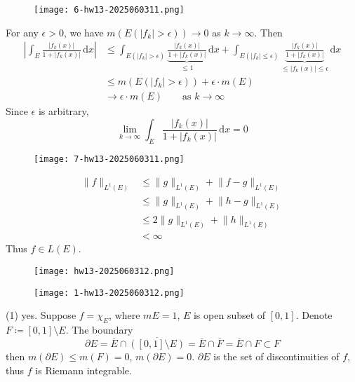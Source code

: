 \begin{exercise}
\begin{figure}[H]
\centering
\texttt{[image: 6-hw13-2025060311.png]}
\label{}
\end{figure}
\end{exercise}
For any $\epsilon>0$, we have $m(E(\lvert f_k \rvert>\epsilon))\to0$ as $k\to \infty$. Then
\[
\begin{aligned}
\left\lvert  \int_{E}^{} \frac{\lvert f_k(x) \rvert }{1+\lvert f_k(x) \rvert } \, \mathrm{d}x   \right\rvert  & \leq \int_{E(\lvert f_k \rvert >\epsilon)}^{} \underbrace{ \frac{\lvert f_k(x) \rvert }{1+\lvert f_k(x) \rvert } }_{ \leq 1 }  \, \mathrm{d}x  +\int_{E(\lvert f_k \rvert \leq \epsilon)}^{}\underbrace{  \frac{\lvert f_k(x) \rvert }{1+\lvert f_k(x) \rvert } }_{ \leq \lvert f_k(x) \rvert \leq \epsilon } \, \mathrm{d}x  \\
 & \leq m(E(\lvert f_k \rvert >\epsilon)) +\epsilon \cdot m(E) \\
 & \to \epsilon \cdot m(E) \qquad \text{as }k\to \infty
\end{aligned}
\]
Since $\epsilon$ is arbitrary,
\[
\lim_{ k \to \infty } \int_{E}^{} \frac{\lvert f_k(x) \rvert }{1+\lvert f_k(x) \rvert } \, \mathrm{d}x =0
\]
\begin{exercise}
\begin{figure}[H]
\centering
\texttt{[image: 7-hw13-2025060311.png]}
\label{}
\end{figure}
\end{exercise}
\[
\begin{aligned}
\lVert f \rVert _{L^{1}(E)} & \leq \lVert g \rVert _{L^{1}(E)} +\lVert f-g \rVert _{L^{1}(E)} \\
 & \leq \lVert g \rVert _{L^{1}(E)}+\lVert h-g \rVert _{L^{1}(E)} \\
 & \leq 2\lVert g \rVert _{L^{1}(E)}+\lVert h \rVert _{L^{1}(E)} \\
 & <\infty
\end{aligned} 
\]
Thus $f\in L(E)$.

\begin{exercise}
\begin{figure}[H]
\centering
\texttt{[image: hw13-2025060312.png]}
\label{}
\end{figure}
\end{exercise}
\begin{figure}[H]
\centering
\texttt{[image: 1-hw13-2025060312.png]}
\label{}
\end{figure}
(1) yes. Suppose $f=\chi_{E}$, where $mE=1$, $E$ is open subset of $[0,1]$. Denote $F\coloneqq[0,1]\setminus E$. The boundary
\[
\partial E=\overline{E}\cap  \overline{([0,1]\setminus E)}=\overline{E}\cap \overline{F}=\overline{E}\cap F\subset F
\]
then $m(\partial E)\leq m(F)=0$, $m(\partial E)=0$. $\partial E$ is the set of discontinuities of $f$, thus $f$ is Riemann integrable.

